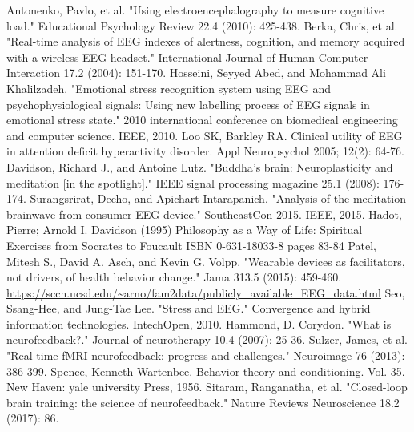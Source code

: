 \documentclass{llncs} %
\begin{document}
\begin{thebibliography}{[MT1]}
    Antonenko, Pavlo, et al. "Using electroencephalography to measure cognitive load." Educational Psychology Review 22.4 (2010): 425-438.
    Berka, Chris, et al. "Real-time analysis of EEG indexes of alertness, cognition, and memory acquired with a wireless EEG headset." International Journal of Human-Computer Interaction 17.2 (2004): 151-170.
    Hosseini, Seyyed Abed, and Mohammad Ali Khalilzadeh. "Emotional stress recognition system using EEG and psychophysiological signals: Using new labelling process of EEG signals in emotional stress state." 2010 international conference on biomedical engineering and computer science. IEEE, 2010.
    Loo SK, Barkley RA. Clinical utility of EEG in attention deficit hyperactivity disorder. Appl Neuropsychol 2005; 12(2): 64-76.
    Davidson, Richard J., and Antoine Lutz. "Buddha's brain: Neuroplasticity and meditation [in the spotlight]." IEEE signal processing magazine 25.1 (2008): 176-174.
    Surangsrirat, Decho, and Apichart Intarapanich. "Analysis of the meditation brainwave from consumer EEG device." SoutheastCon 2015. IEEE, 2015.
    Hadot, Pierre; Arnold I. Davidson (1995) Philosophy as a Way of Life: Spiritual Exercises from Socrates to Foucault ISBN 0-631-18033-8 pages 83-84
    Patel, Mitesh S., David A. Asch, and Kevin G. Volpp. "Wearable devices as facilitators, not drivers, of health behavior change." Jama 313.5 (2015): 459-460.
    \url{https://sccn.ucsd.edu/~arno/fam2data/publicly_available_EEG_data.html}
    Seo, Ssang-Hee, and Jung-Tae Lee. "Stress and EEG." Convergence and hybrid information technologies. IntechOpen, 2010.
    Hammond, D. Corydon. "What is neurofeedback?." Journal of neurotherapy 10.4 (2007): 25-36.
    Sulzer, James, et al. "Real-time fMRI neurofeedback: progress and challenges." Neuroimage 76 (2013): 386-399.
    Spence, Kenneth Wartenbee. Behavior theory and conditioning. Vol. 35. New Haven: yale university Press, 1956.
    Sitaram, Ranganatha, et al. "Closed-loop brain training: the science of neurofeedback." Nature Reviews Neuroscience 18.2 (2017): 86.
\end{thebibliography}
\end{document}
